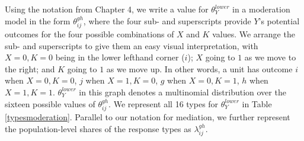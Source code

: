 \documentclass[12pt,]{book}
\begin{document}
Using the notation from Chapter 4, we write a value for \(\theta_Y^{lower}\) in a moderation model in the form \(\theta_{ij}^{gh}\), where the four sub- and superscripts provide \(Y\)'s potential outcomes for the four possible combinations of \(X\) and \(K\) values. We arrange the sub- and superscripts to give them an easy visual interpretation, with \(X=0, K=0\) being in the lower lefthand corner (\(i\)); \(X\) going to \(1\) as we move to the right; and \(K\) going to \(1\) as we move up. In other words, a unit has outcome \(i\) when \(X=0, K=0\), \(j\) when \(X=1, K=0\), \(g\) when \(X=0, K=1\), \(h\) when \(X=1, K=1\). \(\theta_Y^{lower}\) in this graph denotes a multinomial distribution over the sixteen possible values of \(\theta_{ij}^{gh}\). We represent all 16 types for \(\theta_Y^{lower}\) in Table \ref{typesmoderation}. Parallel to our notation for mediation, we further represent the population-level shares of the response types as \(\lambda_{ij}^{gh}\).
\end{document}
